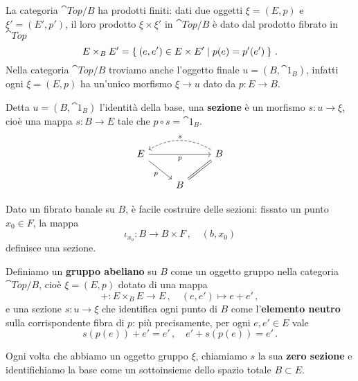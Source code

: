 La categoria $\cat{Top}/B$ ha prodotti finiti: dati due oggetti $\xi = (E,p)$
e $\xi' = (E',p')$, il loro prodotto $\xi \times \xi'$ in $\cat{Top}/B$ 
è dato dal prodotto fibrato in $\cat{Top}$
\begin{equation*}
	E \times_{B} E' = \Set{(e,e') \in E \times E' | p(e) = p'(e')}\,.
\end{equation*}
Nella categoria $\cat{Top}/B$ troviamo anche l'oggetto finale $u = (B,\cat{1}_{B})$,
infatti ogni $\xi = (E,p)$ ha un'unico morfismo $\xi \to u$
dato da $p:E \to B$.

\begin{df}
	Detta $ u = (B,\cat{1}_{B})$ l'identità della base,
	una \textbf{sezione} è un morfismo $s:u \to \xi$,
	cioè una mappa $s:B \to E$ tale che $p \circ s = \cat{1}_{B}$.
	\begin{equation*}
		\begin{tikzcd}
			E \ar[rr,"p"'] \ar[dr,"p"'] & & B \ar[ll, "s"', bend right, dashed] \ar[dl, equals] \\
			& B &
		\end{tikzcd}
	\end{equation*}
\end{df}

\begin{ex}
	Dato un fibrato banale su $B$, è facile costruire delle sezioni:
	fissato un punto $x_{0} \in F$, la mappa 
	\begin{equation*}
		\iota_{x_{o}} : B \longrightarrow B \times F\,,
		\quad (b,x_{0})
	\end{equation*}
	definisce una sezione.
\end{ex}

\begin{df}
	Definiamo un \textbf{gruppo abeliano} su $B$ come 
	un oggetto gruppo nella categoria $\cat{Top}/B$,
	cioè $\xi = (E,p)$ dotato di una mappa
	\begin{equation*}
		+ : E \times_{B} E \longrightarrow E\,, \quad (e,e') \longmapsto e + e'\,,
	\end{equation*}
	e una sezione $s:u \to \xi$ che identifica ogni punto di $B$
	come  l'\textbf{elemento neutro} sulla corrispondente fibra di $p$:
	più precisamente, per ogni $e,e' \in E$ vale
	\begin{equation*}
		s(p(e)) + e' = e'\,, \quad e' + s(p(e)) = e'\,.
	\end{equation*}
\end{df}

Ogni volta che abbiamo un oggetto gruppo $\xi$,
chiamiamo $s$ la sua \textbf{zero sezione}
e identifichiamo la base come un sottoinsieme dello spazio totale $B \subset E$.

